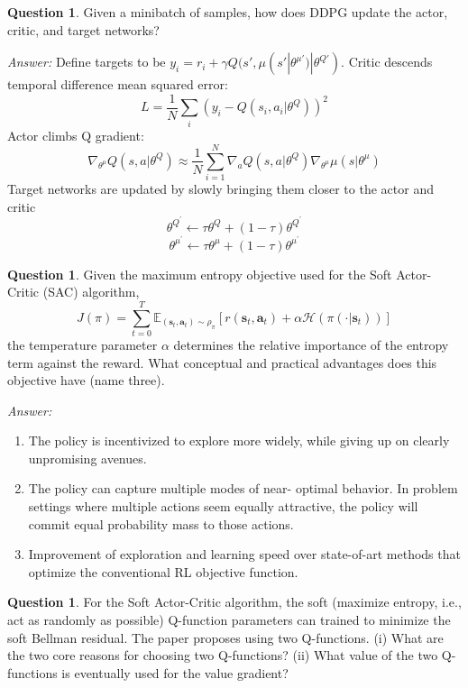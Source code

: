 \documentclass{article}
\theoremstyle{definition}
\newtheorem{question}[thm]{Question}
\newenvironment{answer}{\noindent\textit{Answer:}}{}
\begin{document}
\begin{question} 
Given a minibatch of samples, how does DDPG update the actor, critic, and target networks?
\end{question}

\begin{answer}
Define targets to be $y_i = r_i + \gamma Q(s', \mu(s'|\theta^{\mu'})|\theta^{Q'})$.
Critic descends temporal difference mean squared error: 
$$L = \frac{1}{N}\sum_i(y_i - Q(s_i, a_i|\theta^{Q}))^2$$
Actor climbs Q gradient: 
$$\nabla_{\theta^\mu}Q(s,a|\theta^Q) \approx \frac{1}{N}\sum_{i=1}^N \nabla_{a}Q(s,a|\theta^Q)\nabla_{\theta^\mu}\mu(s|\theta^\mu)$$
Target networks are updated by slowly bringing them closer to the actor and critic
$$\theta^{Q^{\prime}} \leftarrow \tau \theta^{Q}+(1-\tau) \theta^{Q^{\prime}} $$
$$\theta^{\mu^{\prime}} \leftarrow \tau \theta^{\mu}+(1-\tau) \theta^{\mu^{\prime}}$$
\end{answer}

\begin{question}
Given the maximum entropy objective used for the Soft Actor-Critic (SAC) algorithm,
\begin{equation}
    J(\pi) = \sum_{t=0}^{T} \mathbb{E}_{(\mathbf{s}_{t}, \mathbf{a}_{t})\sim \rho_{\pi}} [r(\mathbf{s}_{t}, \mathbf{a}_{t}) + \alpha \mathcal{H}(\pi (\cdot{} | \mathbf{s}_{t}))]
\end{equation}
the temperature parameter $\alpha$ determines the relative importance of the entropy term against the reward. What conceptual and practical advantages does this objective have (name three).
\end{question}

\begin{answer}
    \begin{enumerate}
        \item The policy is incentivized to explore more widely, while giving up on clearly unpromising avenues.
        \item The policy can capture multiple modes of near- optimal behavior. In problem settings where multiple actions seem equally attractive, the policy will commit equal probability mass to those actions.
        \item Improvement of exploration and learning speed over state-of-art methods that optimize the conventional RL objective function.
    \end{enumerate}
\end{answer}

\begin{question}
    For the Soft Actor-Critic algorithm, the soft (maximize entropy, i.e., act as randomly as possible) Q-function parameters can trained to minimize the soft Bellman residual. The paper proposes using two Q-functions. (i) What are the two core reasons for choosing two Q-functions? (ii) What value of the two Q-functions is eventually used for the value gradient?
\end{question}
\end{document}
